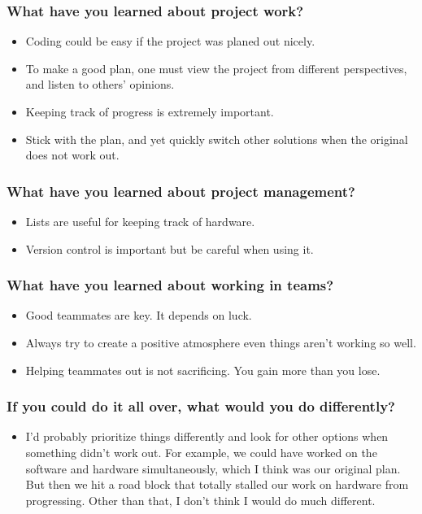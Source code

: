 \documentclass[compsoc,draftclsnofoot,onecolumn,10pt]{IEEEtran}
\begin{document}
\subsubsection*{What have you learned about project work?}
\begin{itemize}
    \item Coding could be easy if the project was planed out nicely.
    \item To make a good plan, one must view the project from different
    perspectives, and listen to others' opinions.
    \item Keeping track of progress is extremely important.
    \item Stick with the plan, and yet quickly switch other solutions
    when the original does not work out.
\end{itemize}

\subsubsection*{What have you learned about project management?}
\begin{itemize}
    \item Lists are useful for keeping track of hardware.
    \item Version control is important but be careful when using it.
\end{itemize}

\subsubsection*{What have you learned about working in teams?}
\begin{itemize}
    \item Good teammates are key. It depends on luck.
    \item Always try to create a positive atmosphere even things aren't
    working so well.
    \item Helping teammates out is not sacrificing. You gain more than you
    lose.
\end{itemize}

\subsubsection*{If you could do it all over, what would you do differently?}
\begin{itemize}
  \item I'd probably prioritize things differently and look for other options
  when something didn't work out. For example, we could have worked on the
  software and hardware simultaneously, which I think was our original plan.
  But then we hit a road block that totally stalled our work on hardware from
  progressing. Other than that, I don't think I would do much different.
\end{itemize}
\end{document}

